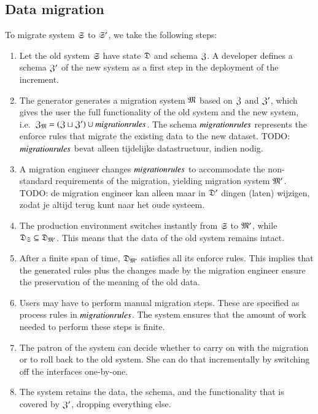 \documentclass{elsarticle}
\begin{document}
\subsection{Data migration}
   To migrate system $\mathfrak{S}$ to $\mathfrak{S}'$, we take the following steps:
\begin{enumerate}
   \item Let the old system $\mathfrak{S}$ have state $\mathfrak{D}$ and schema $\mathfrak{Z}$.
         A developer defines a schema $\mathfrak{Z}'$ of the new system as a first step in the deployment of the increment.
   \item The generator generates a migration system $\mathfrak{M}$ based on $\mathfrak{Z}$ and $\mathfrak{Z}'$,
         which gives the user the full functionality of the old system and the new system,
         i.e.\ $\mathfrak{Z}_{\mathfrak{M}}=(\mathfrak{Z}\sqcup\mathfrak{Z}')\cup\text{\it migrationrules\/}$.
         The schema $\text{\it migrationrules\/}$ represents the enforce rules that migrate the existing data to the new dataset.
         TODO: $\text{\it migrationrules\/}$ bevat alleen tijdelijke datastructuur, indien nodig.
   \item A migration engineer changes $\text{\it migrationrules\/}$ to accommodate the non-standard requirements of the migration,
         yielding migration system $\mathfrak{M}'$.
         TODO: de migration engineer kan alleen maar in $\mathfrak{D}'$ dingen (laten) wijzigen, zodat je altijd terug kunt naar het oude systeem.
   \item The production environment switches instantly from $\mathfrak{S}$ to $\mathfrak{M}'$,
         while $\mathfrak{D}_{\mathfrak{S}}\subseteq\mathfrak{D}_{\mathfrak{M}'}$.
         This means that the data of the old system remains intact.
   \item After a finite span of time, $\mathfrak{D}_{\mathfrak{M}'}$ satisfies all its enforce rules.
         This implies that the generated rules plus the changes made by the migration engineer ensure the preservation of the meaning of the old data.
   \item Users may have to perform manual migration steps.
         These are specified as process rules in $\text{\it migrationrules\/}$.
         The system ensures that the amount of work needed to perform these steps is finite.
   \item The patron of the system can decide whether to carry on with the migration or to roll back to the old system.
         She can do that incrementally by switching off the interfaces one-by-one.
   \item The system retains the data, the schema, and the functionality that is covered by $\mathfrak{Z}'$, dropping everything else.
\end{enumerate}
\end{document}

